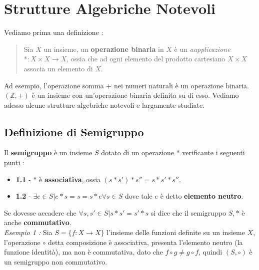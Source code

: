 \documentclass[12pt, letterpaper]{article}
\begin{document}
\section{Strutture Algebriche Notevoli}
Vediamo prima una definizione :
\begin{quote}
    Sia \(X\) un insieme, un \textbf{operazione binaria} in \(X\) è un \textit{aapplicazione} 
    \(* : X\times X \rightarrow X\), ossia che ad ogni elemento del prodotto cartesiano \(X\times X\) associa
    un elemento di \(X\).
\end{quote}
Ad esempio, l'operazione somma \(+\) nei numeri naturali è un operazione binaria. \((\mathbb{Z},+)\) è un insieme con 
un'operazione binaria definita su di esso. Vediamo adesso alcune strutture algebriche notevoli e largamente studiate.
\subsection{Definizione di Semigruppo}
Il \textbf{semigruppo} è un insieme \(S\) dotato di un operazione \(*\) verificante i seguenti punti :
\begin{itemize}
    \item \textbf{1.1} - \(*\) è \textbf{associativa}, ossia \((s*s')*s''=s*s'*s''\).
    \item \textbf{1.2} - \(\exists e \in S | e*s=s=s*e \forall s\in S\) dove tale \(e\) è detto \textbf{elemento neutro}.
\end{itemize}
Se dovesse accadere che \(\forall s,s' \in S | s*s'=s'*s\) si dice che il semigruppo \(S,*\) è anche \textbf{commutativo}.
\\\textit{Esempio 1 : } Sia \(S=\{f:X\rightarrow X\}\) l'insieme delle funzioni definite su un insieme \(X\), l'operazione
\(\circ \) detta composizione è associativa, presenta l'elemento neutro (la funzione identità), ma non è commutativa, 
dato che \(f \circ g\ne g \circ f\), quindi \((S,\circ)\) è un semigruppo non commutativo.
\end{document}
